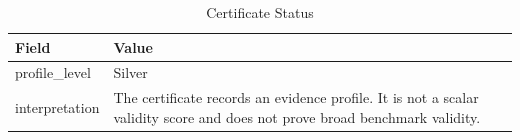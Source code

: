 \begin{table}[t]
\centering
\caption{Certificate Status}
\begin{tabular}{ll}
\toprule
Field & Value \\
\midrule
profile\_level & Silver \\
interpretation & The certificate records an evidence profile. It is not a scalar validity score and does not prove broad benchmark validity. \\
\bottomrule
\end{tabular}
\end{table}
